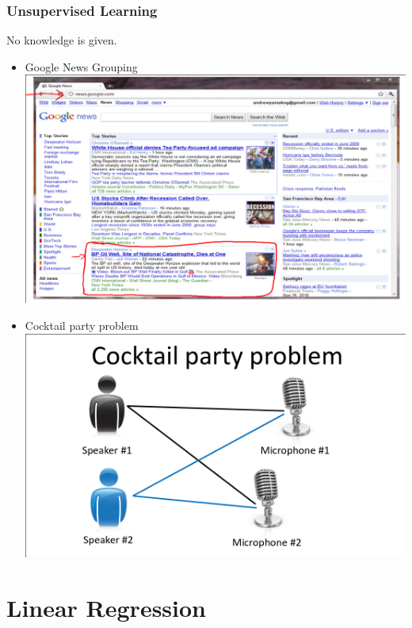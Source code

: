 \documentclass[11pt]{article}
\begin{document}
\subsubsection*{Unsupervised Learning}
\label{sec-2-2-2}
No knowledge is given.
\begin{itemize}
\item Google News Grouping
\label{sec-2-2-2-1}
\includegraphics[width=.9\linewidth]{./images/screenshot-03.png}
\item Cocktail party problem
\label{sec-2-2-2-2}
\includegraphics[width=.9\linewidth]{./images/screenshot-04.png}
\end{itemize}
\section*{Linear Regression}
\label{sec-3}
\end{document}
